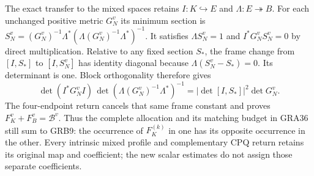 The exact transfer to the mixed spaces retains $I:K\hookrightarrow E$
and $\Lambda:E\twoheadrightarrow B$.  For each unchanged positive metric
$G_N^v$ its minimum section is
$S_N^v=(G_N^v)^{-1}\Lambda^*(\Lambda(G_N^v)^{-1}\Lambda^*)^{-1}$.
It satisfies $\Lambda S_N^v=1$ and $I^*G_N^vS_N^v=0$ by direct
multiplication.  Relative to any fixed section $S_*$, the frame change
from $[I,S_*]$ to $[I,S_N^v]$ has identity diagonal because
$\Lambda(S_N^v-S_*)=0$.  Its determinant is one.  Block orthogonality
therefore gives
\[
 \det(I^*G_N^vI)\,
 \det(\Lambda(G_N^v)^{-1}\Lambda^*)^{-1}
 =|\det[I,S_*]|^2\det G_N^v.
\]
The four-endpoint return cancels that same frame constant and proves
$F_K^v+F_B^v=\mathcal B^v$.  Thus the complete allocation and its matching
budget in GRA36 still sum to GRB9: the occurrence of $F_K^{(k)}$ in one
has its opposite occurrence in the other.  Every intrinsic mixed profile
and complementary CPQ return retains its original map and coefficient;
the new scalar estimates do not assign those separate coefficients.

\label{GRBUILD:GRB_SHIFTED_ACTION:end}




\endgroup

